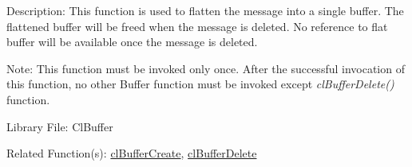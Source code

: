 \begin{Desc}
\item[Description:]This function is used to flatten the message into a single buffer. The flattened buffer will be freed when the message is deleted. No reference to flat buffer will be available once the message is deleted.\end{Desc}
\begin{Desc}
\item[Note:]This function must be invoked only once. After the successful invocation of this function, no other Buffer function must be invoked except
\textit{clBufferDelete()} function.\end{Desc}
\begin{Desc}
\item[Library File:]Cl\-Buffer\end{Desc}
\begin{Desc}
\item[Related Function(s):]\hyperlink{pagebuf103}{cl\-Buffer\-Create}, \hyperlink{pagebuf105}{cl\-Buffer\-Delete} \end{Desc}


